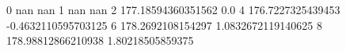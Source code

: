 0 nan nan
1 nan nan
2 177.18594360351562 0.0
4 176.7227325439453 -0.4632110595703125
6 178.2692108154297 1.0832672119140625
8 178.98812866210938 1.80218505859375

